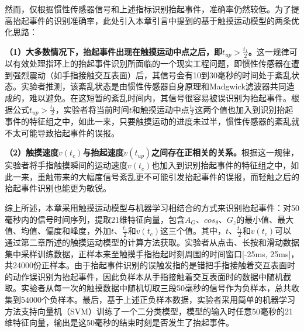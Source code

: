 然而，仅根据惯性传感器信号和上述指标识别抬起事件，准确率仍然较低。为了提高抬起事件的识别准确率，此处引入本章引言中提到的基于触摸运动模型的两条优化思路：

\textbf{（1）大多数情况下，抬起事件出现在触摸运动中点之后，即$t_{up}>\frac{t_1}{2}$。}这一规律可以有效处理指环上的抬起事件识别所面临的一个现实工程问题，即惯性传感器在遭到强烈震动（如手指接触交互表面）后，其信号会有10到30毫秒的时间处于紊乱状态。实验者推测，该紊乱状态是由惯性传感器自身原理和Madgwick滤波器共同造成的，难以避免。在这短暂的紊乱时间内，其信号很容易被误识别为抬起事件。根据公式$t_{up}>\frac{t_1}{2}$，实验者将当前时间$t$和触摸运动中点$\frac{t_1}{2}$这两个值也加入到识别抬起事件的特征组之中，如此一来，只要触摸运动的进度未过半，惯性传感器的紊乱就不太可能导致抬起事件的误报。

\textbf{（2）触摸速度$v(t_c)$与抬起速度$v(t_{up})$之间存在正相关的关系。}根据这一规律，实验者将手指触摸瞬间的运动速度$v(t_c)$也加入到识别抬起事件的特征组之中，如此一来，重触带来的大幅度信号紊乱更不可能引发抬起事件的误报，而轻触之后的抬起事件识别也能更为敏锐。


综上所述，本章采用触摸运动模型与机器学习相结合的方式来识别抬起事件：对50毫秒内的信号时间序列，提取21维特征向量，包含$A_G$、$cos_\theta$、$G_z$的最小值、最大值、均值、偏度和峰度，外加$t$、$\frac{t_1}{2}$和$v(t_c)$这三个值。其中，$t$、$\frac{t_1}{2}$和$v(t_c)$可以通过第二章所述的触摸运动模型的计算方法获取。实验者从点击、长按和滑动数据集中采样训练数据，正样本来至触摸手指抬起时刻周围的时间窗口[-25ms, 25ms]，共24000份正样本。由于抬起事件识别的误触发指的是错把手指接触着交互表面时的动作误识别为抬起事件，因此负样本从手指接触着交互表面时的数据中随机截取。实验者从每一次的触摸数据中随机切取三段50毫秒的信号作为负样本，总共收集到54000个负样本。最后，基于上述正负样本数据，实验者采用简单的机器学习方法支持向量机（SVM）训练了一个二分类模型，模型的输入时任意50毫秒的21维特征向量，输出是这50毫秒的结束时刻是否发生了抬起事件。

